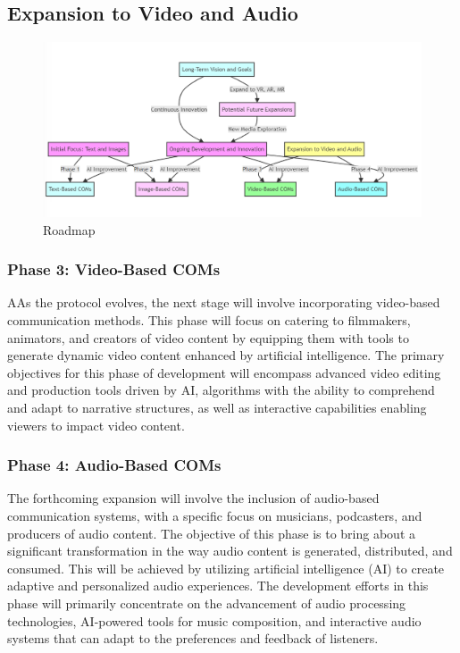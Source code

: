 \documentclass[12pt,a4paper]{article}
\begin{document}
\subsection{Expansion to Video and Audio}


\begin{figure}
    \centering
    \includegraphics[width=1\linewidth]{create_5.png}
    \caption{Roadmap}
    \label{fig:roadmap}
\end{figure}

\subsubsection{Phase 3: Video-Based COMs}

AAs the protocol evolves, the next stage will involve incorporating video-based communication methods. This phase will focus on catering to filmmakers, animators, and creators of video content by equipping them with tools to generate dynamic video content enhanced by artificial intelligence. The primary objectives for this phase of development will encompass advanced video editing and production tools driven by AI, algorithms with the ability to comprehend and adapt to narrative structures, as well as interactive capabilities enabling viewers to impact video content.
\subsubsection{Phase 4: Audio-Based COMs}

The forthcoming expansion will involve the inclusion of audio-based communication systems, with a specific focus on musicians, podcasters, and producers of audio content. The objective of this phase is to bring about a significant transformation in the way audio content is generated, distributed, and consumed. This will be achieved by utilizing artificial intelligence (AI) to create adaptive and personalized audio experiences. The development efforts in this phase will primarily concentrate on the advancement of audio processing technologies, AI-powered tools for music composition, and interactive audio systems that can adapt to the preferences and feedback of listeners.
\end{document}
